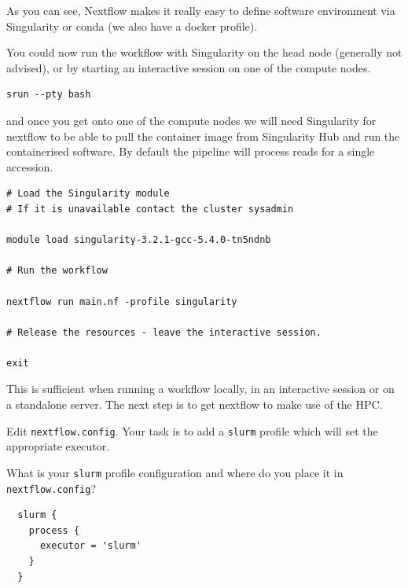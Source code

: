 As you can see, Nextflow makes it really easy to %
define software environment via Singularity or conda (we also have a docker profile). 

You could now run the workflow with Singularity on the head node (generally not advised), 
or by starting an interactive session on one of the compute nodes.

\begin{steps}
\begin{lstlisting}
srun --pty bash
\end{lstlisting}

and once you get onto one of the compute nodes we will need Singularity for nextflow to be able to pull the container image from Singularity Hub and run the containerised software. 
By default the pipeline will process reads for a single accession.


\begin{lstlisting}
# Load the Singularity module 
# If it is unavailable contact the cluster sysadmin

module load singularity-3.2.1-gcc-5.4.0-tn5ndnb

# Run the workflow

nextflow run main.nf -profile singularity

# Release the resources - leave the interactive session.

exit
\end{lstlisting}

\end{steps}

This is sufficient when running a workflow locally, in an interactive session or on a standalone server. 
The next step is to get nextflow to make use of the HPC.\\ 

\begin{steps}
Edit \texttt{nextflow.config}. Your task is to add a \texttt{slurm} profile which will set the appropriate executor. 
\end{steps}

\begin{questions}
What is your \texttt{slurm} profile configuration and where do you place it in \texttt{nextflow.config}?
\begin{answer}
\begin{lstlisting}
  slurm {
    process {
      executor = 'slurm'
    }
  }
\end{lstlisting}
\end{answer}
\end{questions}

